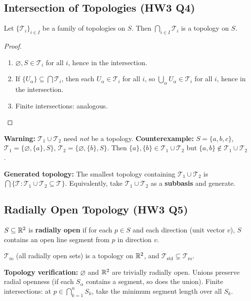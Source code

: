 \documentclass{article}
\begin{document}
\subsection{Intersection of Topologies (HW3 Q4)}
\begin{proposition}
  Let $\{\mathcal{T}_i\}_{i \in I}$ be a family of topologies on $S$.
  Then $\bigcap_{i \in I} \mathcal{T}_i$ is a topology on $S$.
\end{proposition}
\begin{proof}
  \begin{enumerate}
    \item $\varnothing, S \in \mathcal{T}_i$ for all $i$, hence in the
      intersection.
    \item If $\{U_\alpha\} \subseteq \bigcap \mathcal{T}_i$, then each
      $U_\alpha \in \mathcal{T}_i$ for all $i$, so $\bigcup_\alpha
      U_\alpha \in \mathcal{T}_i$ for all $i$, hence in the
      intersection.
    \item Finite intersections: analogous.
  \end{enumerate}
\end{proof}

\textbf{Warning:} $\mathcal{T}_1 \cup \mathcal{T}_2$ need \emph{not}
be a topology. \textbf{Counterexample:} $S = \{a,b,c\}$,
$\mathcal{T}_1 = \{\varnothing, \{a\}, S\}$,
$\mathcal{T}_2 = \{\varnothing, \{b\}, S\}$.
Then $\{a\}, \{b\} \in \mathcal{T}_1 \cup \mathcal{T}_2$ but $\{a,b\}
\notin \mathcal{T}_1 \cup \mathcal{T}_2$.

\textbf{Generated topology:} The smallest topology containing
$\mathcal{T}_1 \cup \mathcal{T}_2$ is
$\bigcap\{\mathcal{T} : \mathcal{T}_1 \cup \mathcal{T}_2 \subseteq
\mathcal{T}\}$. Equivalently, take $\mathcal{T}_1 \cup \mathcal{T}_2$
as a \textbf{subbasis} and generate.

\subsection{Radially Open Topology (HW3 Q5)}
\begin{definition}
  $S \subseteq \mathbb{R}^2$ is \textbf{radially open} if for each $p \in S$
  and each direction (unit vector $v$), $S$ contains an open line
  segment from $p$ in direction $v$.
\end{definition}

\begin{proposition}
  $\mathcal{T}_{\mathrm{ro}}$ (all radially open sets) is a topology on
  $\mathbb{R}^2$, and $\mathcal{T}_{\mathrm{std}} \subsetneq
  \mathcal{T}_{\mathrm{ro}}$.
\end{proposition}
\textbf{Topology verification:} $\varnothing$ and $\mathbb{R}^2$ are trivially
radially open. Unions preserve radial openness (if each $S_\alpha$
contains a segment, so does the union). Finite intersections: at $p \in
\bigcap_{k=1}^n S_k$, take the minimum segment length over all $S_k$.
\end{document}
